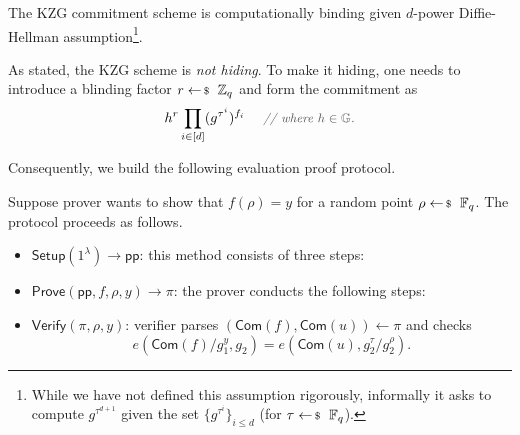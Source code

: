\documentclass[../../book]{subfiles}
\begin{document}
\begin{lemma}
    The KZG commitment scheme is computationally binding given $d$-power Diffie-Hellman assumption\footnote{While we have not defined this assumption rigorously, informally it asks to compute $g^{\tau^{d+1}}$ given the set $\{g^{\tau^i}\}_{i\leq d}$ (for $\tau \leftarrowS \mathbb{F}_q$).}.
\end{lemma}

\begin{remark}
    As stated, the KZG scheme is \emph{not hiding}. To make it hiding, one needs to introduce a blinding factor $r \leftarrowS \mathbb{Z}_q$ and form the commitment as
    \begin{equation*}
        h^r\prod_{i \in [d]}(g^{\tau^i})^{f_i} \quad \commentgray{where $h \in \mathbb{G}$.}
    \end{equation*}
\end{remark}

Consequently, we build the following evaluation proof protocol.

\begin{definition}\label{def:kzg-proof}
    Suppose prover wants to show that $f(\rho)=y$ for a random point $\rho \leftarrowS \mathbb{F}_q$.
    The protocol proceeds as follows.
    \begin{itemize}
        \item $\mathsf{Setup}(1^{\lambda}) \to \mathsf{pp}$: this method consists of three steps:
        \item $\mathsf{Prove}(\mathsf{pp},f,\rho,y) \to \pi$: the prover conducts the following steps: 
        \item $\mathsf{Verify}(\pi, \rho, y)$: verifier parses $(\mathsf{Com}(f), \mathsf{Com}(u)) \gets \pi$ and checks
        \begin{equation*}
            e(\mathsf{Com}(f)/g_1^y, g_2) = e(\mathsf{Com}(u), g_2^{\tau}/g_2^{\rho}).
        \end{equation*}
    \end{itemize}
\end{definition}
\end{document}
